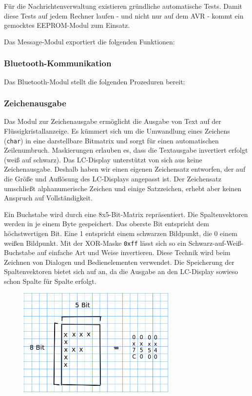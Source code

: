 \documentclass[ngerman]{article}
\begin{document}
Für die Nachrichtenverwaltung existieren gründliche automatische Tests.  Damit
diese Tests auf jedem Rechner laufen - und nicht nur auf dem AVR - kommt ein
gemocktes EEPROM-Modul zum Einsatz.

Das Message-Modul exportiert die folgenden Funktionen:




\subsubsection{Bluetooth-Kommunikation}

Das Bluetooth-Modul stellt die folgenden Prozeduren bereit:




\subsubsection{Zeichenausgabe}

Das Modul zur Zeichenausgabe ermöglicht die Ausgabe von Text auf der
Flüs\-sig\-kris\-tall\-an\-zei\-ge. Es kümmert sich um die Umwandlung eines
Zeichens ({\tt char}) in eine darstellbare Bitmatrix und sorgt für einen
automatischen Zeilenumbruch. Maskierungen erlauben es, dass die Textausgabe
invertiert erfolgt (weiß auf schwarz). Das LC-Display unterstützt von sich aus
keine Zeichenausgabe. Deshalb haben wir einen eigenen Zeichensatz entworfen,
der auf die Größe und Auflösung des LC-Displays angepasst ist. Der Zeichensatz
umschließt alphanumerische Zeichen und einige Satzzeichen, erhebt aber keinen
Anspruch auf Vollständigkeit.

Ein Buchstabe wird durch eine 8x5-Bit-Matrix repräsentiert. Die
Spaltenvektoren werden in je einem Byte gespeichert. Das oberste Bit
entspricht dem höchstwertigen Bit. Eine 1 entspricht einem schwarzen
Bildpunkt, die 0 einem weißen Bildpunkt. Mit der XOR-Maske {\tt 0xff} lässt
sich so ein Schwarz-auf-Weiß-Buchstabe auf einfache Art und Weise
invertieren. Diese Technik wird beim Zeichnen von Dialogen und Bedienelementen 
verwendet. Die Speicherung der Spaltenvektoren bietet sich auf an,
da die Ausgabe an den LC-Display sowieso schon Spalte für Spalte erfolgt.

\begin{figure}[h!] \begin{center}
    \includegraphics[width=0.7\textwidth]{media/char}
\end{center} \end{figure}
\end{document}
